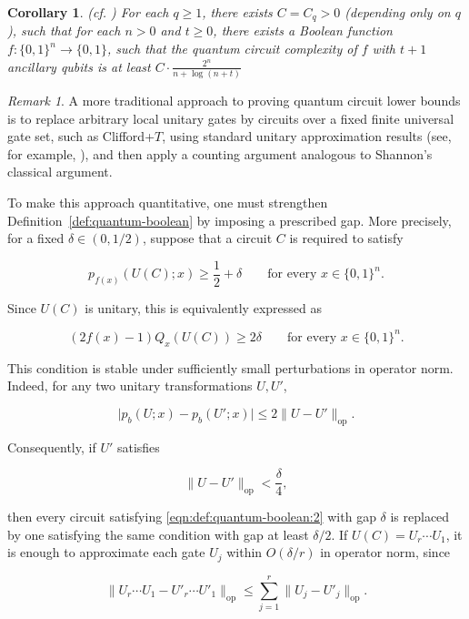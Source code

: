 \documentclass[10pt]{amsart}
\newtheorem{corollary}{Corollary}
\theoremstyle{definition}
\theoremstyle{remark}
\newtheorem{remark}{Remark}
\numberwithin{equation}{section}
\begin{document}
\begin{corollary}(cf. \cite[Theorem 7.1]{Roychowdhury-et-al})
\label{cor:quantum2}
For each $q \geq 1$, there exists $C = C_q > 0$ (depending only on $q$), such that for each $n >0$  and $t \geq 0$,
there exists a Boolean function $f:\{0,1\}^n \rightarrow \{0,1\}$, such that the quantum circuit complexity of $f$ with $t+1$ ancillary qubits is at least  $C \cdot \frac{2^n}{n+\log(n+t)}$
\end{corollary}

\begin{remark}
A more traditional approach to proving quantum circuit lower bounds is to replace arbitrary local unitary gates by circuits over a fixed finite universal gate set, such as Clifford+\(T\), using standard unitary approximation results (see, for example, \cite{Knill95,Maslov-et-al,Selinger}), and then apply a counting argument analogous to Shannon’s classical argument.

To make this approach quantitative, one must strengthen Definition~\ref{def:quantum-boolean} by imposing a prescribed gap. More precisely, for a fixed \(\delta\in(0,1/2)\), suppose that a circuit \(C\) is required to satisfy

\begin{equation}
    \label{eqn:def:quantum-boolean:2}
    p_{f(x)}(U(C);x)\ge \frac12+\delta
\qquad\text{for every }x\in\{0,1\}^n.
\end{equation}


Since \(U(C)\) is unitary, this is equivalently expressed as

$$
(2f(x)-1)Q_x(U(C))\ge 2\delta
\qquad\text{for every }x\in\{0,1\}^n.
$$

This condition is stable under sufficiently small perturbations in operator norm. Indeed, for any two unitary transformations \(U,U'\),

$$
\bigl|p_b(U;x)-p_b(U';x)\bigr|
   \le 2\lVert U-U'\rVert_{\mathrm{op}}.
$$

Consequently, if \(U'\) satisfies

$$
\lVert U-U'\rVert_{\mathrm{op}}<\frac{\delta}{4},
$$

then every circuit satisfying \eqref{eqn:def:quantum-boolean:2} with gap \(\delta\) is replaced by one satisfying the same condition with gap at least \(\delta/2\). If \(U(C)=U_r\cdots U_1\), it is enough to approximate each gate \(U_j\) within \(O(\delta/r)\) in operator norm, since

$$
\bigl\|U_r\cdots U_1-U'_r\cdots U'_1\bigr\|_{\mathrm{op}}
   \le \sum_{j=1}^r\lVert U_j-U'_j\rVert_{\mathrm{op}}.
$$


\end{remark}
\end{document}
